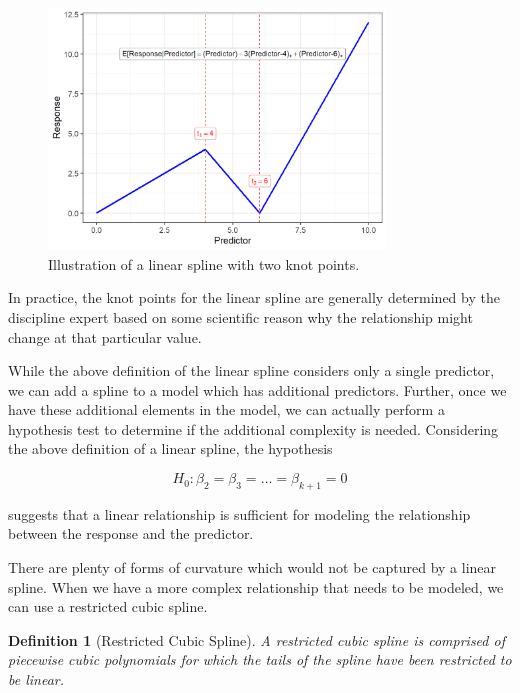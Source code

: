 \documentclass[
]{book}
\theoremstyle{plain}
\theoremstyle{mydefn}
\newtheorem{definition}{Definition}[chapter]
\theoremstyle{myexmpl}
\theoremstyle{remark}
\begin{document}
\begin{figure}

{\centering \includegraphics[width=0.8\textwidth]{./Images/glm-splines-linear-spline-1} 

}

\caption{Illustration of a linear spline with two knot points.}\label{fig:glm-splines-linear-spline}
\end{figure}

\begin{rmdtip}
In practice, the knot points for the linear spline are generally determined by the discipline expert based on some scientific reason why the relationship might change at that particular value.
\end{rmdtip}

While the above definition of the linear spline considers only a single predictor, we can add a spline to a model which has additional predictors. Further, once we have these additional elements in the model, we can actually perform a hypothesis test to determine if the additional complexity is needed. Considering the above definition of a linear spline, the hypothesis

\[H_0: \beta_2 = \beta_3 = \dotsc = \beta_{k+1} = 0\]

suggests that a linear relationship is sufficient for modeling the relationship between the response and the predictor.

There are plenty of forms of curvature which would not be captured by a linear spline. When we have a more complex relationship that needs to be modeled, we can use a restricted cubic spline.

\begin{definition}[Restricted Cubic Spline]
\protect\hypertarget{def:defn-restricted-cubic-spline}{}{\label{def:defn-restricted-cubic-spline} {} }A restricted cubic spline is comprised of piecewise cubic polynomials for which the tails of the spline have been restricted to be linear.\\
\end{definition}
\end{document}
